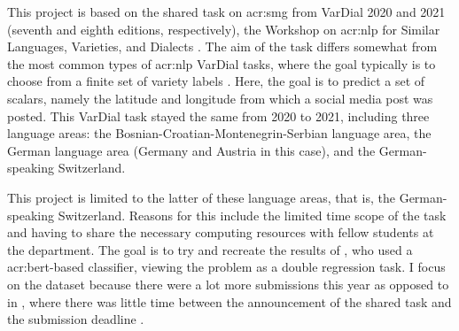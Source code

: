 \begin{comment}
The introduction can also briefly describe what methodology you will apply to reach the goal and the reasons for this choice of research methodology.
It can furthermore provide a brief summary of the main contributions of the work,
and should provide the reader with an overview of what is coming in the next sections.
You want to say more than what is explicit in the section names, if possible, but still keep the description short and to the point.
\end{comment}

This project is based on the shared task on \gls{acr:smg} from VarDial 2020 and 2021 (seventh and eighth editions, respectively), the Workshop on \gls{acr:nlp} for Similar Languages, Varieties, and Dialects \citep{gamanReportVarDialEvaluation2020, chakravarthiFindingsVarDialEvaluation2021}. The aim of the task differs somewhat from the most common types of \gls{acr:nlp} VarDial tasks, where the goal typically is to choose from a finite set of variety labels \citep[1]{scherrerSocialMediaVariety2021}. Here, the goal is to predict a set of scalars, namely the latitude and longitude from which a social media post was posted. This VarDial task stayed the same from 2020 to 2021, including three language areas: the Bosnian-Croatian-Montenegrin-Serbian language area, the German language area (Germany and Austria in this case), and the German-speaking Switzerland.

This project is limited to the latter of these language areas, that is, the German-speaking Switzerland. Reasons for this include the limited time scope of the task and having to share the necessary computing resources with fellow students at the department. The goal is to try and recreate the results of \cite{scherrerHeLjuVarDial20202020}, who used a \acrshort{acr:bert}-based classifier, viewing the problem as a double regression task. I focus on the \citeyear{scherrerHeLjuVarDial20202020} dataset because there were a lot more submissions this year as opposed to in \citeyear{scherrerSocialMediaVariety2021}, where there was little time between the announcement of the shared task and the submission deadline \citep[6]{chakravarthiFindingsVarDialEvaluation2021}.


